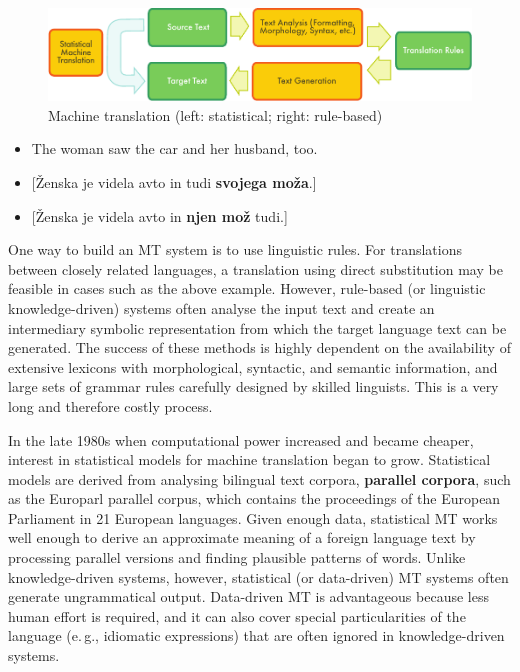\begin{multicols}{2}
\begin{figure}[htb]
  \center
  \includegraphics[width=\textwidth]{../_media/english/machine_translation}
  \caption{Machine translation (left: statistical; right: rule-based)}
  \label{fig:mtarch_en}
\end{figure}

\begin{itemize}
\item The woman saw the car and her husband, too.
\item {[}Ženska je videla avto in tudi \textbf{svojega moža}.{]}
\item {[}Ženska je videla avto in \textbf{njen mož} tudi.{]}
\end{itemize}

One way to build an MT system is to use linguistic rules. For translations between closely related languages, a translation using direct substitution may be feasible in cases such as the above example. However, rule-based (or linguistic knowledge-driven) systems often analyse the input text and create an intermediary symbolic representation from which the target language text can be generated. The success of these methods is highly dependent on the availability of extensive lexicons with morphological, syntactic, and semantic information, and large sets of grammar rules carefully designed by skilled linguists. This is a very long and therefore costly process.

In the late 1980s when computational power increased and became cheaper, interest in statistical models for machine translation began to grow. Statistical models are derived from analysing bilingual text corpora, \textbf{parallel corpora}, such as the Europarl parallel corpus, which contains the proceedings of the European Parliament in 21 European languages. Given enough data, statistical MT works well enough to derive an approximate meaning of a foreign language text by processing parallel versions and finding plausible patterns of words. Unlike knowledge-driven systems, however, statistical (or data-driven) MT systems often generate ungrammatical output. Data-driven MT is advantageous because less human effort is required, and it can also cover special particularities of the language (e.\,g., idiomatic expressions) that are often ignored in knowledge-driven systems. 


\end{multicols}
